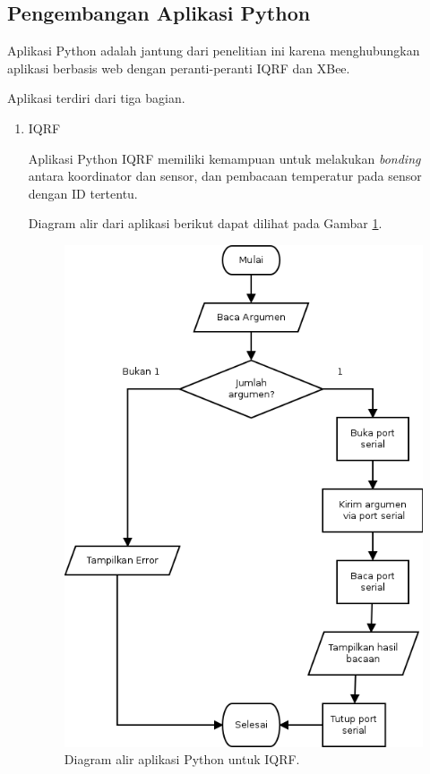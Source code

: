 		\subsection{Pengembangan Aplikasi Python}
			Aplikasi Python adalah jantung dari penelitian ini karena menghubungkan aplikasi berbasis web dengan peranti-peranti IQRF dan XBee.

			Aplikasi terdiri dari tiga bagian.

			\begin{enumerate}
				\item IQRF

					Aplikasi Python IQRF memiliki kemampuan untuk melakukan \emph{bonding} antara koordinator dan sensor, dan pembacaan temperatur pada sensor dengan ID tertentu.

					Diagram alir dari aplikasi berikut dapat dilihat pada Gambar \ref{python-iqrf}.

					\begin{figure}[ht!]
					  \centering
					    \includegraphics{gambar/python-iqrf}
					    \caption{Diagram alir aplikasi Python untuk IQRF.}
					    \label{python-iqrf}
					\end{figure}


\end{enumerate}
